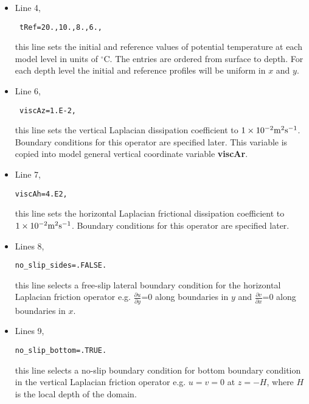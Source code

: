 \begin{itemize}

\item Line 4, 
\begin{verbatim} tRef=20.,10.,8.,6., \end{verbatim} 
this line sets
the initial and reference values of potential temperature at each model
level in units of $^{\circ}\mathrm{C}$.
The entries are ordered from surface to depth. For each
depth level the initial and reference profiles will be uniform in
$x$ and $y$.



\item Line 6, 
\begin{verbatim} viscAz=1.E-2, \end{verbatim} 
this line sets the vertical Laplacian dissipation coefficient to
$1 \times 10^{-2} {\rm m^{2}s^{-1}}$. Boundary conditions
for this operator are specified later. This variable is copied into
model general vertical coordinate variable {\bf viscAr}.


\item Line 7, 
\begin{verbatim}
viscAh=4.E2,
\end{verbatim} 
this line sets the horizontal Laplacian frictional dissipation coefficient to
$1 \times 10^{-2} {\rm m^{2}s^{-1}}$. Boundary conditions
for this operator are specified later.

\item Lines 8,
\begin{verbatim}
no_slip_sides=.FALSE.
\end{verbatim}
this line selects a free-slip lateral boundary condition for
the horizontal Laplacian friction operator 
e.g. $\frac{\partial u}{\partial y}$=0 along boundaries in $y$ and
$\frac{\partial v}{\partial x}$=0 along boundaries in $x$.

\item Lines 9,
\begin{verbatim}
no_slip_bottom=.TRUE.
\end{verbatim}
this line selects a no-slip boundary condition for bottom
boundary condition in the vertical Laplacian friction operator 
e.g. $u=v=0$ at $z=-H$, where $H$ is the local depth of the domain.


\end{itemize}
